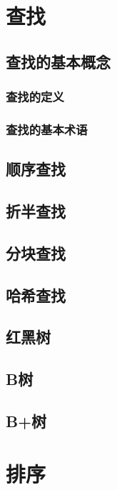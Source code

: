 \documentclass[lang=cn,newtx,10pt,scheme=chinese]{elegantbook}
\begin{document}
\chapter{查找}

\section{查找的基本概念}

\subsection{查找的定义}

\subsection{查找的基本术语}

\section{顺序查找}

\section{折半查找}

\section{分块查找}

\section{哈希查找}

\section{红黑树}

\section{B树}

\section{B+树}

\chapter{排序}
\end{document}
